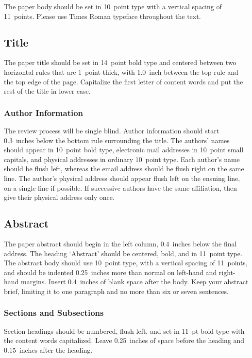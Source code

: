 \documentclass{article}
\begin{document}
The paper body should be set in 10~point type with a vertical spacing of 11~points. Please use Times Roman typeface throughout the text.

\subsection{Title}

The paper title should be set in 14~point bold type and centered between two horizontal rules that are 1~point thick, with 1.0~inch between the top rule and the top edge of the page. Capitalize the first letter of content words and put the rest of the title in lower case.


\subsubsection{Author Information}
\label{final author}
The review process will be single blind. Author information should start 0.3~inches below the bottom rule surrounding the title. The authors' names should appear in 10~point bold type, electronic mail addresses in 10~point small capitals, and physical addresses in ordinary 10~point type. Each author's name should be flush left, whereas the email address should be flush right on the same line. The author's physical address should appear flush left on the ensuing line, on a single line if possible. If successive authors have the same affiliation, then give their physical address only once.

\subsection{Abstract}

The paper abstract should begin in the left column, 0.4~inches below the final address. The heading `Abstract' should be centered, bold, and in 11~point type. The abstract body should use 10~point type, with a vertical spacing of 11~points, and should be indented 0.25~inches more than normal on left-hand and right-hand margins. Insert 0.4~inches of blank space after the body. Keep your abstract brief, limiting it to one paragraph and no more than six or seven sentences.

\subsubsection{Sections and Subsections}

Section headings should be numbered, flush left, and set in 11~pt bold type with the content words capitalized. Leave 0.25~inches of space before the heading and 0.15~inches after the heading.
\end{document}
